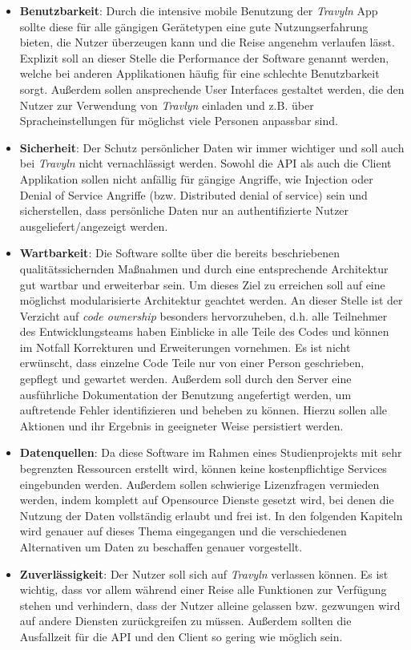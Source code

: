 \begin{itemize}
	\item \textbf{Benutzbarkeit}: Durch die intensive mobile Benutzung der \textit{Travyln} App sollte diese für alle gängigen Gerätetypen eine gute Nutzungserfahrung bieten, die Nutzer überzeugen kann und die Reise angenehm verlaufen lässt. Explizit soll an dieser Stelle die Performance der Software genannt werden, welche bei anderen Applikationen häufig für eine schlechte Benutzbarkeit sorgt. Außerdem sollen ansprechende User Interfaces gestaltet werden, die den Nutzer zur Verwendung von \textit{Travlyn} einladen und z.B. über Spracheinstellungen für möglichst viele Personen anpassbar sind.
	\item \textbf{Sicherheit}: Der Schutz persönlicher Daten wir immer wichtiger und soll auch bei \textit{Travyln} nicht vernachlässigt werden. Sowohl die API als auch die Client Applikation sollen nicht anfällig für gängige Angriffe, wie Injection oder Denial of Service Angriffe (bzw. Distributed denial of service) \cite{Mirkovic.2005} sein und sicherstellen, dass persönliche Daten nur an authentifizierte Nutzer ausgeliefert/angezeigt werden.
	\item \textbf{Wartbarkeit}: Die Software sollte über die bereits beschriebenen qualitätssichernden Maßnahmen und durch eine entsprechende Architektur gut wartbar und erweiterbar sein. Um dieses Ziel zu erreichen soll auf eine möglichst modularisierte Architektur geachtet werden. An dieser Stelle ist der Verzicht auf \textit{code ownership} besonders hervorzuheben, d.h. alle Teilnehmer des Entwicklungsteams haben Einblicke in alle Teile des Codes und können im Notfall Korrekturen und Erweiterungen vornehmen. Es ist nicht erwünscht, dass einzelne Code Teile nur von einer Person geschrieben, gepflegt und gewartet werden. Außerdem soll durch den Server eine ausführliche Dokumentation der Benutzung angefertigt werden, um auftretende Fehler identifizieren und beheben zu können. Hierzu sollen alle Aktionen und ihr Ergebnis in geeigneter Weise persistiert werden.
	\item \textbf{Datenquellen}: Da diese Software im Rahmen eines Studienprojekts mit sehr begrenzten Ressourcen erstellt wird, können keine kostenpflichtige Services eingebunden werden. Außerdem sollen schwierige Lizenzfragen vermieden werden, indem komplett auf Opensource Dienste gesetzt wird, bei denen die Nutzung der Daten vollständig erlaubt und frei ist. In den folgenden Kapiteln wird genauer auf dieses Thema eingegangen und die verschiedenen Alternativen um Daten zu beschaffen genauer vorgestellt.
	\item \textbf{Zuverlässigkeit}: Der Nutzer soll sich auf \textit{Travyln} verlassen können. Es ist wichtig, dass vor allem während einer Reise alle Funktionen zur Verfügung stehen und verhindern, dass der Nutzer alleine gelassen bzw. gezwungen wird auf andere Diensten zurückgreifen zu müssen.
	Außerdem sollten die Ausfallzeit für die API und den Client so gering wie möglich sein.
\end{itemize} 